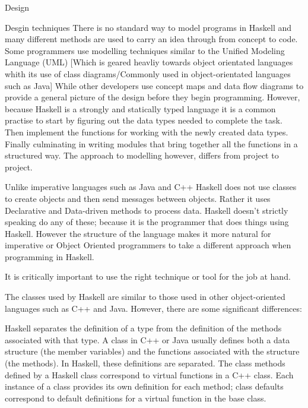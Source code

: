 \documentclass[main.tex]{subfiles}
\begin{document}

Design

Desgin techniques
There is no standard way to model programs in Haskell and many different methods are used to carry an idea through from concept to code. Some programmers use modelling techniques similar to the Unified Modeling Language (UML) [Which is geared heavliy towards object orientated languages whith its use of class diagrams/Commonly used in object-orientated languages such as Java] While other developers use concept maps and data flow diagrams to provide a general picture of the design before they begin programming. However, because Haskell is a strongly and statically typed language it is a common practise to start by figuring out the data types needed to complete the task. Then implement the functions for working with the newly created data types. Finally culminating in writing modules that bring together all the functions in a structured way. The approach to modelling however, differs from project to project.

Unlike imperative languages such as Java and C++ Haskell does not use classes to create objects and then send messages between objects. Rather it uses Declarative and Data-driven methods to process data. Haskell doesn't strictly speaking do any of these; because it is the programmer that does things using Haskell. However the structure of the language makes it more natural for imperative or Object Oriented programmers to take a different approach when programming in Haskell.

It is critically important to use the right technique or tool for the job at hand.



The classes used by Haskell are similar to those used in other object-oriented languages such as C++ and Java. However, there are some significant differences:

Haskell separates the definition of a type from the definition of the methods associated with that type. A class in C++ or Java usually defines both a data structure (the member variables) and the functions associated with the structure (the methods). In Haskell, these definitions are separated. The class methods defined by a Haskell class correspond to virtual functions in a C++ class. Each instance of a class provides its own definition for each method; class defaults correspond to default definitions for a virtual function in the base class.
\end{document}

